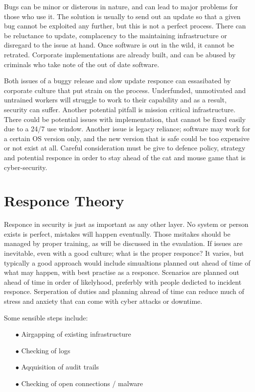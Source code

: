 Bugs can be minor or disterous in nature, and can lead to major problems for those who use it.
The solution is usually to send out an update so that a given bug cannot be exploited any further, but this is not a perfect process. There can be reluctance to update, complacency to the maintaining infrastructure or disregard to the issue at hand.
Once software is out in the wild, it cannot be retrated. Corporate implementations are already built, and can be abused by criminals who take note of the out of date software.

Both issues of a buggy release and slow update responce can essasibated by corporate culture that put strain on the process. Underfunded, unmotivated and untrained workers will struggle to work to their capability and as a result, security can suffer. 
Another potential pitfall is mission critical infrastructure. There could be potential issues with implementation, that cannot be fixed easily due to a 24/7 use window. Another issue is legacy reliance; software may work for a certain OS version only, 
and the new version that is safe could be too expensive or not exist at all. Careful consideration must be give to defence policy, strategy and potential responce in order to stay ahead of the cat and mouse game that is cyber-security.



\section{Responce Theory}
Responce in security is just as important as any other layer. No system or person exists is perfect, mistakes will happen eventually. Those msitakes should be managed by proper training, as will be discussed in the evaulation.
If issues are inevitable, even with a good culture; what is the proper responce? It varies, but typically a good approach would include simualtions planned out ahead of time of what may happen, with best practise as a responce.
Scenarios are planned out ahead of time in order of likelyhood, preferbly with people dedicted to incident responce. Serperation of duties and planning ahread of time can reduce much of stress and anxiety that can come with cyber attacks or downtime.

Some sensible steps include:
\begin{enumerate}
    \item [$\bullet$] Airgapping of existing infrastructure
    \item [$\bullet$] Checking of logs
    \item [$\bullet$] Aqquisition of audit trails
    \item [$\bullet$] Checking of open connections / malware
\end{enumerate}

